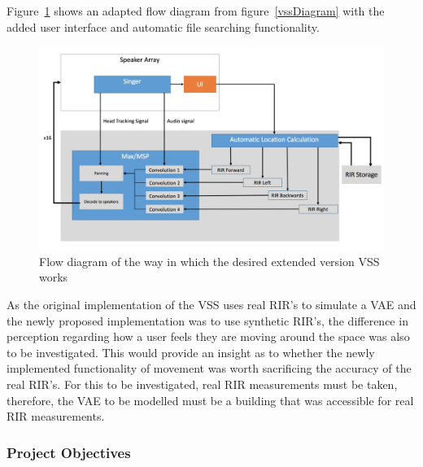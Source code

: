 \documentclass[../../main.tex]{subfiles}
\begin{document}
		Figure~\ref{vssExtention} shows an adapted flow diagram from figure~\ref{vssDiagram} with the added user interface and automatic file searching functionality.

		\begin{figure}[H]
			\centerline{\includegraphics[scale = 0.45]{Sections/Background/images/vssExtention.png}}
			\caption{Flow diagram of the way in which the desired extended version VSS works}
			\label{vssExtention}
		\end{figure}

		As the original implementation of the \ac{VSS} uses real \ac{RIR}'s to simulate a \ac{VAE} and the newly proposed implementation was to use synthetic \ac{RIR}'s, the difference in perception regarding how a user feels they are moving around the space was also to be investigated. This would provide an insight as to whether the newly implemented functionality of movement was worth sacrificing the accuracy of the real \ac{RIR}'s. For this to be investigated, real \ac{RIR} measurements must be taken, therefore, the \ac{VAE} to be modelled must be a building that was accessible for real \ac{RIR} measurements.


	\subsubsection{Project Objectives}
\end{document}
